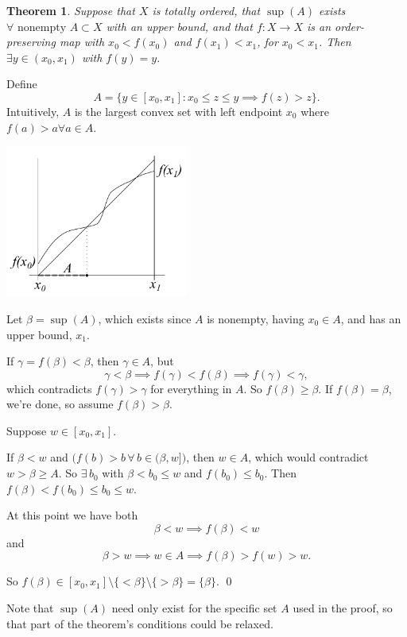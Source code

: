 \documentclass[11pt]{amsart}
\newtheorem{Thm}[Def]{Theorem}
\newcommand\bpf[1][]{\smallskip\noindent{\bf Proof#1.}\quad}
\newcommand\epf{\qed\medskip}
\begin{document}
\begin{Thm}
Suppose that $X$ is totally ordered, that $\sup (A)$ exists
$\forall \text{ nonempty } A\subset X$ with an upper bound,
and that $f:X\to X$ is an
order-preserving map with $x_0 < f(x_0)$ and $f(x_1) < x_1$,
for $x_0 < x_1$. Then $\exists y \in (x_0, x_1)$ with $f(y) = y$.
\end{Thm}

\bpf
Define
$$ A = \{ y \in [x_0, x_1] : x_0 \le z \le y \implies f(z) > z \}. $$
Intuitively, $A$ is the largest convex set with left endpoint $x_0$
where $f(a) > a \forall a \in A$.


\centerline{
\includegraphics[width=6.0cm]{set_theory_ideas1.pdf}
}

Let $\beta = \sup (A)$, which exists since $A$ is nonempty,
having $x_0 \in A$, and has an upper bound, $x_1$.

If $\gamma = f(\beta) < \beta$, then $\gamma \in A$, but
$$ \gamma < \beta \implies f(\gamma) < f(\beta)
  \implies f(\gamma) < \gamma, $$
which contradicts
$f(\gamma) > \gamma$ for everything in $A$.
So $f(\beta) \ge \beta$. If $f(\beta) = \beta$, we're done,
so assume $f(\beta) > \beta$.

Suppose $w \in [x_0, x_1]$.

If $\beta < w$ and $\big(f(b) > b \,\forall\, b \in (\beta, w]\big)$,
then $w \in A$, which would contradict $w > \beta \ge A$.
So $\exists\, b_0$ with $\beta < b_0 \le w$
and $f(b_0) \le b_0$.  Then $f(\beta) < f(b_0) \le b_0 \le w$.

At this point we have both
$$ \beta < w \implies f(\beta) < w $$
and
$$ \beta > w \implies w \in A \implies f(\beta) > f(w) > w.$$

So $f(\beta) \in [x_0, x_1] \setminus \{ < \beta \} \setminus \{ > \beta \} = \{\beta\}$.
\epf

Note that $\sup (A)$ need only  exist for the specific set $A$
used in the proof, so that part of the theorem's conditions could be relaxed.
\end{document}
